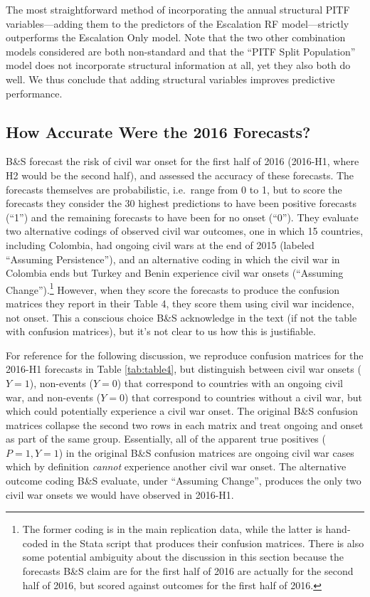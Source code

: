 \documentclass[
]{article}
\begin{document}
The most straightforward method of incorporating the annual structural PITF variables---adding them to the predictors of the Escalation RF model---strictly outperforms the Escalation Only model. Note that the two other combination models considered are both non-standard and that the ``PITF Split Population'' model does not incorporate structural information at all, yet they also both do well. We thus conclude that adding structural variables improves predictive performance.

\hypertarget{how-accurate-were-the-2016-forecasts}{%
\subsection{How Accurate Were the 2016 Forecasts?}\label{how-accurate-were-the-2016-forecasts}}

B\&S forecast the risk of civil war onset for the first half of 2016 (2016-H1, where H2 would be the second half), and assessed the accuracy of these forecasts. The forecasts themselves are probabilistic, i.e.~range from 0 to 1, but to score the forecasts they consider the 30 highest predictions to have been positive forecasts (``1'') and the remaining forecasts to have been for no onset (``0''). They evaluate two alternative codings of observed civil war outcomes, one in which 15 countries, including Colombia, had ongoing civil wars at the end of 2015 (labeled ``Assuming Persistence''), and an alternative coding in which the civil war in Colombia ends but Turkey and Benin experience civil war onsets (``Assuming Change'').\footnote{\label{fn:leadDV}The former coding is in the main replication data, while the latter is hand-coded in the Stata script that produces their confusion matrices. There is also some potential ambiguity about the discussion in this section because the forecasts B\&S claim are for the first half of 2016 are actually for the second half of 2016, but scored against outcomes for the first half of 2016.} However, when they score the forecasts to produce the confusion matrices they report in their Table 4, they score them using civil war incidence, not onset. This a conscious choice B\&S acknowledge in the text (if not the table with confusion matrices), but it's not clear to us how this is justifiable.

For reference for the following discussion, we reproduce confusion matrices for the 2016-H1 forecasts in Table \ref{tab:table4}, but distinguish between civil war onsets (\(Y=1\)), non-events (\(Y=0\)) that correspond to countries with an ongoing civil war, and non-events (\(Y=0\)) that correspond to countries without a civil war, but which could potentially experience a civil war onset. The original B\&S confusion matrices collapse the second two rows in each matrix and treat ongoing and onset as part of the same group. Essentially, all of the apparent true positives (\(P=1, Y=1\)) in the original B\&S confusion matrices are ongoing civil war cases which by definition \emph{cannot} experience another civil war onset. The alternative outcome coding B\&S evaluate, under ``Assuming Change'', produces the only two civil war onsets we would have observed in 2016-H1.
\end{document}
